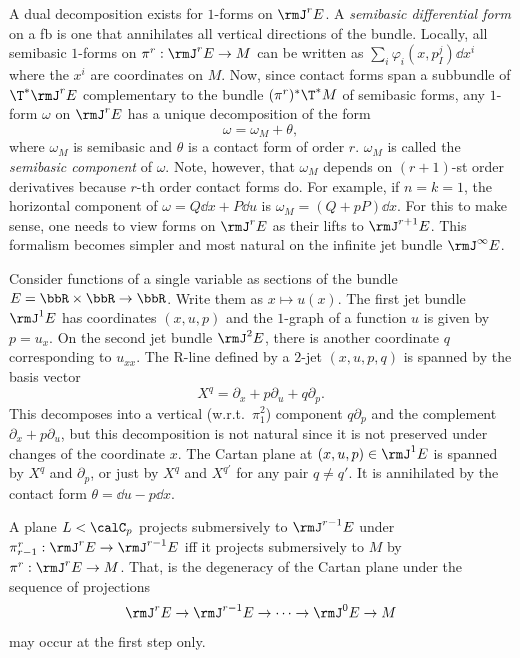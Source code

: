 \begin{rem}\label{rem semibasic and contact forms}
    A dual decomposition exists for $1$-forms on $\rmJ^r E$. A \emph{semibasic differential form} on a \gls{fb} is one that annihilates all vertical directions of the bundle. Locally, all semibasic $1$-forms on $\pi^r:\rmJ^r E\to M$ can be written as $\sum_i \varphi_i(x,p^j_I)\dd x^i$ where the $x^i$ are coordinates on $M$. Now, since contact forms span a subbundle of $\T^\ast \rmJ^r E$ complementary to the bundle $(\pi^r)^\ast \T^\ast M$ of semibasic forms, any $1$-form $\omega$ on $\rmJ^r E$ has a unique decomposition of the form 
    \[\omega=\omega_{M}+\theta,\]
    where $\omega_M$ is semibasic and $\theta$ is a contact form of order $r$. $\omega_M$ is called the \emph{semibasic component} of $\omega$. 
    Note, however, that $\omega_M$ depends on $(r+1)$-st order derivatives because $r$-th order contact forms do. For example, if $n=k=1$, the horizontal component of $\omega=Q\dd x+P\dd u$ is $\omega_M=(Q+pP)\dd x$. For this to make sense, one needs to view forms on $\rmJ^r E$ as their lifts to $\rmJ^{r+1}E$. This formalism becomes simpler and most natural on the infinite jet bundle $\rmJ^\infty E$.
\end{rem}


\begin{example}
    Consider functions of a single variable as sections of the bundle $E=\bbR\times\bbR\to \bbR$. Write them as $x\mapsto u(x)$. The first jet bundle $\rmJ^1 E$ has coordinates $(x,u,p)$ and the $1$-graph of a function $u$ is given by $p=u_x$. On the second jet bundle $\rmJ^2 E$, there is another coordinate $q$ corresponding to $u_{xx}$. The R-line defined by a $2$-jet $(x,u,p,q)$ is spanned by the basis vector 
    \[X^q=\partial_x+p\partial_u+q\partial_p.\]
    This decomposes into a vertical (w.r.t.\ $\pi^2_1$) component $q\partial_p$ and the complement $\partial_x+p\partial_u$, but this decomposition is not natural since it is not preserved under changes of the coordinate $x$. The Cartan plane at $(x,u,p)\in\rmJ^1 E$ is spanned by $X^q$ and $\partial_p$, or just by $X^{q}$ and $X^{q'}$ for any pair $q\neq q'$. It is annihilated by the contact form $\theta=\dd u-p\dd x$.
\end{example}

\begin{cor}
    A plane $L<\calC_p$ projects submersively to $\rmJ^{r-1}E$ under $\pi^r_{r-1}:\rmJ^r E\to \rmJ^{r-1}E$ iff it projects submersively to $M$ by $\pi^r:\rmJ^r E\to M$. That, is the degeneracy of the Cartan plane under the sequence of projections 
    \[\rmJ^r E\to \rmJ^{r-1}E\to\cdots\to \rmJ^0 E\to M\] 
    may occur at the first step only.
\end{cor}

